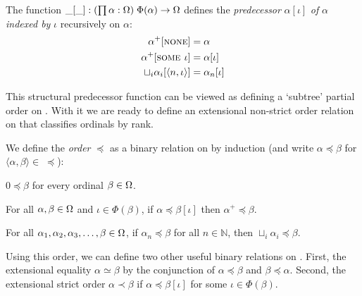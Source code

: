 \begin{definition}%
The function $\_[\_] : (\prod \alpha : \Omega) \; \Phi(\alpha)
\rightarrow \Omega$ defines the \emph{predecessor} $\alpha[\iota]$
\emph{of} $\alpha$ \emph{indexed by} $\iota$ recursively on $\alpha$:
\begin{align*}
  \alpha^+[\textsc{none}]                     &= \alpha \\
  \alpha^+[\textsc{some $\iota$}]             &= \alpha[\iota] \\
  \sqcup_i \alpha_i[\langle n, \iota \rangle] &= \alpha_n[\iota]
\end{align*}
\end{definition}


This structural predecessor function can be viewed as defining a `subtree'
partial order on \Ord. With it we are ready to define an extensional
non-strict order relation on \Ord that classifies ordinals by rank.

\begin{definition}\label{def:order}%
We define the \emph{order} $\preceq$ as a binary relation on \Ord by
induction (and write $\alpha \preceq \beta$ for $\langle \alpha, \beta \rangle
\in \; \preceq$):
\begin{compactenum}
  \item
    $0 \preceq \beta$ for every ordinal $\beta \in \Omega$.
  \item\label{def:order:succ}
    For all $\alpha, \beta \in \Omega$ and $\iota \in \Phi(\beta)$, if
    $\alpha \preceq \beta[\iota]$ then $\alpha^+ \preceq \beta$.
  \item
    For all $\alpha_1, \alpha_2, \alpha_3, \ldots, \beta \in \Omega$, if
    $\alpha_n \preceq \beta$ for all $n \in \mathbb{N}$, then $\sqcup_i
    \alpha_i \preceq \beta$.
\end{compactenum}
\end{definition}

Using this order, we can define two other useful binary relations on
\Ord. First, the extensional equality $\alpha \simeq \beta$ by the
conjunction of $\alpha \preceq \beta$ and $\beta \preceq \alpha$. Second, the
extensional strict order $\alpha \prec \beta$ if $\alpha \preceq
\beta[\iota]$ for some $\iota \in \Phi(\beta)$.

